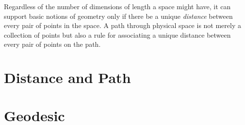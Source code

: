 \documentclass[nobib]{tufte-book}
\begin{document}
Regardless of the number of dimensions of length a space might have, it can
support basic notions of geometry only if there be a unique \emph{distance}
between every pair of points in the space.  A path through physical space is
not merely a collection of points but also a rule for associating a unique
distance between every pair of points on the path.

\section{Distance and Path}

\section{Geodesic}

\appendix

\backmatter






\printindex
\end{document}
